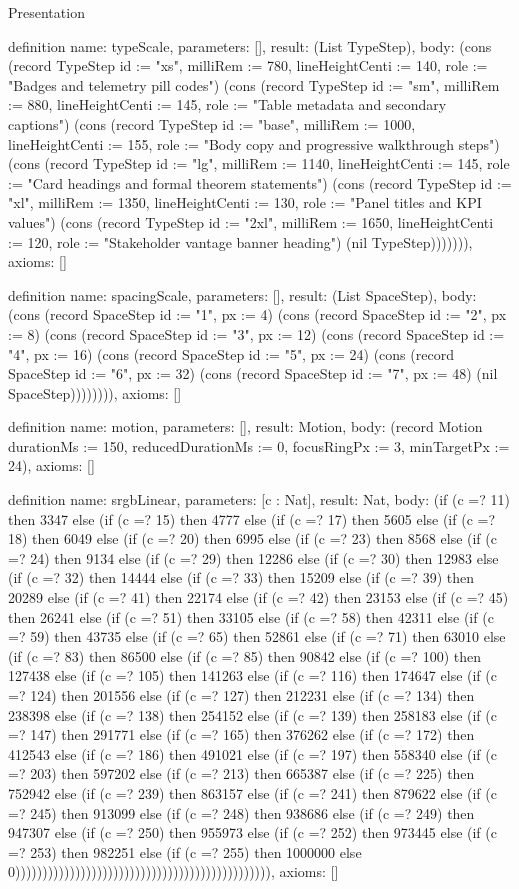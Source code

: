 \begin{lexlean}{Presentation}
\begin{semanticmodule}
definition{
  name: typeScale,
  parameters: [],
  result: (List TypeStep),
  body: (cons (record TypeStep {id := "xs", milliRem := 780, lineHeightCenti := 140, role := "Badges and telemetry pill codes"}) (cons (record TypeStep {id := "sm", milliRem := 880, lineHeightCenti := 145, role := "Table metadata and secondary captions"}) (cons (record TypeStep {id := "base", milliRem := 1000, lineHeightCenti := 155, role := "Body copy and progressive walkthrough steps"}) (cons (record TypeStep {id := "lg", milliRem := 1140, lineHeightCenti := 145, role := "Card headings and formal theorem statements"}) (cons (record TypeStep {id := "xl", milliRem := 1350, lineHeightCenti := 130, role := "Panel titles and KPI values"}) (cons (record TypeStep {id := "2xl", milliRem := 1650, lineHeightCenti := 120, role := "Stakeholder vantage banner heading"}) (nil TypeStep))))))),
  axioms: []
}

definition{
  name: spacingScale,
  parameters: [],
  result: (List SpaceStep),
  body: (cons (record SpaceStep {id := "1", px := 4}) (cons (record SpaceStep {id := "2", px := 8}) (cons (record SpaceStep {id := "3", px := 12}) (cons (record SpaceStep {id := "4", px := 16}) (cons (record SpaceStep {id := "5", px := 24}) (cons (record SpaceStep {id := "6", px := 32}) (cons (record SpaceStep {id := "7", px := 48}) (nil SpaceStep)))))))),
  axioms: []
}

definition{
  name: motion,
  parameters: [],
  result: Motion,
  body: (record Motion {durationMs := 150, reducedDurationMs := 0, focusRingPx := 3, minTargetPx := 24}),
  axioms: []
}

definition{
  name: srgbLinear,
  parameters: [c : Nat],
  result: Nat,
  body: (if (c =? 11) then 3347 else (if (c =? 15) then 4777 else (if (c =? 17) then 5605 else (if (c =? 18) then 6049 else (if (c =? 20) then 6995 else (if (c =? 23) then 8568 else (if (c =? 24) then 9134 else (if (c =? 29) then 12286 else (if (c =? 30) then 12983 else (if (c =? 32) then 14444 else (if (c =? 33) then 15209 else (if (c =? 39) then 20289 else (if (c =? 41) then 22174 else (if (c =? 42) then 23153 else (if (c =? 45) then 26241 else (if (c =? 51) then 33105 else (if (c =? 58) then 42311 else (if (c =? 59) then 43735 else (if (c =? 65) then 52861 else (if (c =? 71) then 63010 else (if (c =? 83) then 86500 else (if (c =? 85) then 90842 else (if (c =? 100) then 127438 else (if (c =? 105) then 141263 else (if (c =? 116) then 174647 else (if (c =? 124) then 201556 else (if (c =? 127) then 212231 else (if (c =? 134) then 238398 else (if (c =? 138) then 254152 else (if (c =? 139) then 258183 else (if (c =? 147) then 291771 else (if (c =? 165) then 376262 else (if (c =? 172) then 412543 else (if (c =? 186) then 491021 else (if (c =? 197) then 558340 else (if (c =? 203) then 597202 else (if (c =? 213) then 665387 else (if (c =? 225) then 752942 else (if (c =? 239) then 863157 else (if (c =? 241) then 879622 else (if (c =? 245) then 913099 else (if (c =? 248) then 938686 else (if (c =? 249) then 947307 else (if (c =? 250) then 955973 else (if (c =? 252) then 973445 else (if (c =? 253) then 982251 else (if (c =? 255) then 1000000 else 0))))))))))))))))))))))))))))))))))))))))))))))),
  axioms: []
}


\end{semanticmodule}
\end{lexlean}
